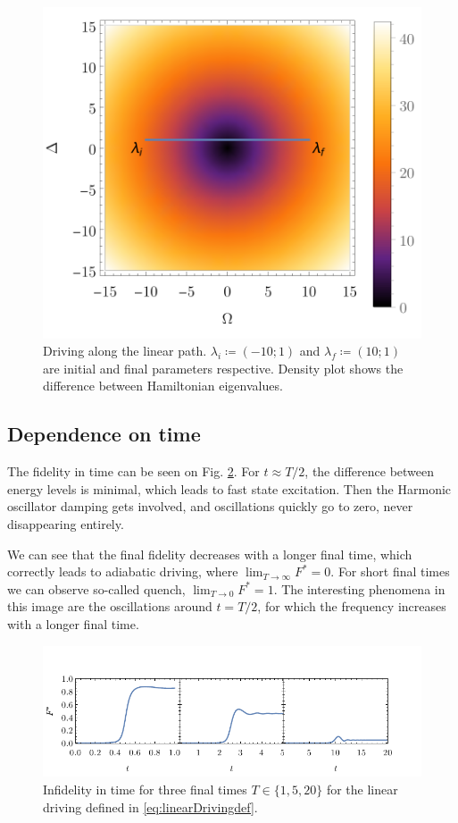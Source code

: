 \begin{figure}[h]
    \centering
    \includegraphics[scale=1.2]{../img/drivingLin.pdf}
    \caption{Driving along the linear path. $\lambda_i\coloneqq(-10;1)$ and $\lambda_f\coloneqq(10;1)$ are initial and final parameters respective. Density plot shows the difference between Hamiltonian eigenvalues.}
    \label{fig:driving1}
\end{figure}


\subsection{Dependence on time}
The fidelity in time can be seen on Fig. \ref{fig:infidelityTimePlotLin}. For $t\approx T/2$, the difference between energy levels is minimal, which leads to fast state excitation. Then the Harmonic oscillator damping gets involved, and oscillations quickly go to zero, never disappearing entirely.

We can see that the final fidelity decreases with a longer final time, which correctly leads to adiabatic driving, where $\lim_{T\rightarrow \infty} F^*=0$. For short final times we can observe so-called quench, $\lim_{T\rightarrow 0} F^*=1$. The interesting phenomena in this image are the oscillations around $t=T/2$, for which the frequency increases with a longer final time. 

\begin{figure}[h]
    \centering 
    \includegraphics[scale=1.185]{../img/infidelityInTimePlot1.pdf}
    \caption{Infidelity in time for three final times $T\in\{1,5,20\}$ for the linear driving defined in \ref{eq:linearDrivingdef}.}
  \label{fig:infidelityTimePlotLin}
\end{figure}



